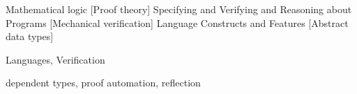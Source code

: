 \begin{abstract}
\end{abstract}

			{Mathematical logic}
			[Proof theory]
			{Specifying and Verifying and Reasoning about Programs}
			[Mechanical verification]
			{Language Constructs and Features}
			[Abstract data types]


\terms
Languages, Verification

\keywords
dependent types, proof automation, reflection
